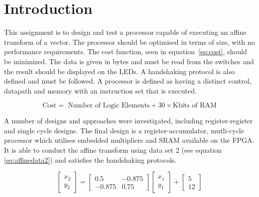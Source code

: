 
\section{Introduction}\label{sect:intro}

This assignment is to design and test a processor capable of executing an affine transform of a vector. 
The processor should be optimised in terms of size, with no performance requirements. 
The cost function, seen in equation~\eqref{eq:cost}, should be minimized. 
The data is given in bytes and must be read from the switches and the result should be displayed on the LEDs. 
A handshaking protocol is also defined and must be followed. 
A processor is defined as having a distinct control, datapath and memory with an instruction set that is executed. 

\begin{equation}\label{eq:cost}
\mbox{Cost} = \mbox{ Number of Logic Elements} + 30 \times \mbox{Kbits of RAM}
\end{equation}

A number of designs and approaches were investigated, including register-register and single cycle designs.
The final design is a register-accumulator, mutli-cycle processor which utilises embedded multipliers and SRAM available on the FPGA. 
It is able to conduct the affine transform using data set 2 (see equation \ref{eq:affinedata2}) and satisfies the handshaking protocols. 

\begin{equation}\label{eq:affinedata2}
\begin{bmatrix}
x_2 \\
y_2 
\end{bmatrix}
=
\begin{bmatrix}
0.5 & -0.875 \\
-0.875 & 0.75 
\end{bmatrix}
\begin{bmatrix}
x_1 \\
y_1
\end{bmatrix}
+
\begin{bmatrix}
5 \\
12
\end{bmatrix}
\end{equation}


